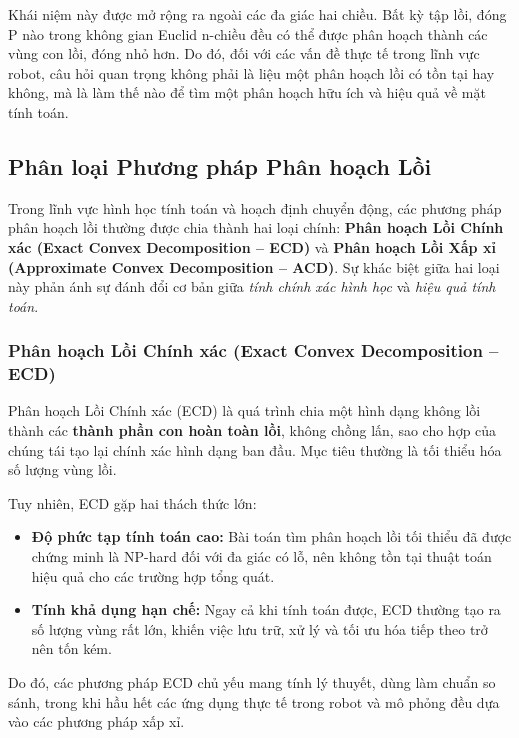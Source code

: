 \documentclass{article}
\begin{document}
Khái niệm này được mở rộng ra ngoài các đa giác hai chiều. Bất kỳ tập lồi, đóng P nào trong không gian Euclid n-chiều đều có thể được phân hoạch thành các vùng con lồi, đóng nhỏ hơn.\cite{keil1985} Do đó, đối với các vấn đề thực tế trong lĩnh vực robot, câu hỏi quan trọng không phải là liệu một phân hoạch lồi có tồn tại hay không, mà là làm thế nào để tìm một phân hoạch hữu ích và hiệu quả về mặt tính toán.

\subsection{Phân loại Phương pháp Phân hoạch Lồi}
\label{sec:convex-decomposition-types}

Trong lĩnh vực hình học tính toán và hoạch định chuyển động, các phương pháp phân hoạch lồi thường được chia thành hai loại chính: 
\textbf{Phân hoạch Lồi Chính xác (Exact Convex Decomposition – ECD)} 
và 
\textbf{Phân hoạch Lồi Xấp xỉ (Approximate Convex Decomposition – ACD)}. 
Sự khác biệt giữa hai loại này phản ánh sự đánh đổi cơ bản giữa \textit{tính chính xác hình học} và \textit{hiệu quả tính toán}.

\subsubsection{Phân hoạch Lồi Chính xác (Exact Convex Decomposition – ECD)}

Phân hoạch Lồi Chính xác (ECD) là quá trình chia một hình dạng không lồi thành các \textbf{thành phần con hoàn toàn lồi}, 
không chồng lấn, sao cho hợp của chúng tái tạo lại chính xác hình dạng ban đầu. 
Mục tiêu thường là tối thiểu hóa số lượng vùng lồi.  

Tuy nhiên, ECD gặp hai thách thức lớn:
\begin{itemize}
    \item \textbf{Độ phức tạp tính toán cao:}  
    Bài toán tìm phân hoạch lồi tối thiểu đã được chứng minh là NP-hard đối với đa giác có lỗ, 
    nên không tồn tại thuật toán hiệu quả cho các trường hợp tổng quát.
    \item \textbf{Tính khả dụng hạn chế:}  
    Ngay cả khi tính toán được, ECD thường tạo ra số lượng vùng rất lớn, 
    khiến việc lưu trữ, xử lý và tối ưu hóa tiếp theo trở nên tốn kém.
\end{itemize}
Do đó, các phương pháp ECD chủ yếu mang tính lý thuyết, dùng làm chuẩn so sánh, 
trong khi hầu hết các ứng dụng thực tế trong robot và mô phỏng đều dựa vào các phương pháp xấp xỉ.
\end{document}

